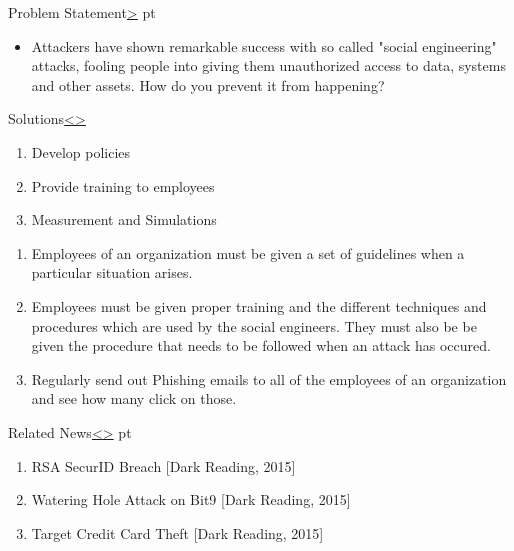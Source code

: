 \documentclass[12pt]{extarticle}
\newenvironment{instructionblock}{\Large\bgroup}{\egroup}
\begin{document}
\pagebreak
{}
\setcounter{section}{1}
\begin{slide}{Problem Statement}{\hyperref[slide 2]{\textgreater}}
	 pt
	\begin{instructionblock}
		\begin{itemize}
			\item Attackers have shown remarkable success with so called "social engineering" attacks, fooling people into giving them unauthorized access to data, systems and other assets. How do you prevent it from happening?
		\end{itemize}
	\end{instructionblock}
\end{slide}


\pagebreak
\begin{slide}{Solutions}{\hyperref[slide 1]{\textless}\hyperref[slide 3]{\textgreater}}
	\begin{instructionblock}
		\begin{enumerate}
			\item Develop policies 
			\item Provide training to employees
			\item Measurement and Simulations
		\end{enumerate}
	\end{instructionblock}
\end{slide}
\begin{enumerate}
	\item Employees of an organization must be given a set of guidelines when a particular situation arises. 
	\item Employees must be given proper training and the different techniques and procedures which are used by the social engineers. They must also be be given the procedure that needs to be followed when an attack has occured.
	\item Regularly send out Phishing emails to all of the employees of an organization and see how many click on those.
\end{enumerate}
\pagebreak
\begin{slide}{Related News}{\hyperref[slide 2]{\textless}\hyperref[slide 4]{\textgreater}}
	 pt
	\begin{instructionblock}
		\begin{enumerate}
		\item RSA SecurID Breach [Dark Reading, 2015]
		\item Watering Hole Attack on Bit9 [Dark Reading, 2015]
		\item Target Credit Card Theft [Dark Reading, 2015]
		\end{enumerate}
	\end{instructionblock}
\end{slide}
\end{document}
